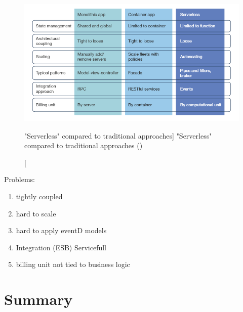 \begin{figure}[ht]
    \includegraphics[width=\linewidth]{images/serverless/demyst.png}\centering
    \caption
    ["Serverless" compared to traditional approaches]
    {"Serverless" compared to traditional approaches (\cite{Hammond2018DemystifyingComputing})}
    \label{fig:slessCompared}
\end{figure}

Problems:
\begin{enumerate}
    \item tightly coupled
    \item hard to scale
    \item hard to apply eventD models
    \item Integration (ESB)  Servicefull
    \item billing unit not tied to business logic
\end{enumerate}


\section{Summary}
